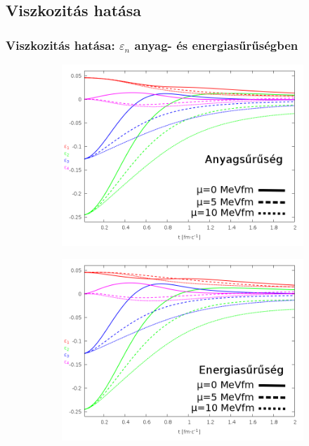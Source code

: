 \documentclass{beamer}
\begin{document}
\subsection{Viszkozitás hatása}
\begin{frame}[noframenumbering]
\frametitle{Viszkozitás hatása: $\varepsilon_n$ anyag- és energiasűrűségben}
\begin{center}
\begin{figure}[H]
	\centering
    \begin{subfigure}[b]{0.49\textwidth}
    		\includegraphics[width=\textwidth]{pic/res/nonrel/eps_visc_r}
	\end{subfigure}
	\begin{subfigure}[b]{0.49\textwidth}
        	\includegraphics[width=\textwidth]{pic/res/nonrel/eps_visc_p}
	\end{subfigure}
\end{figure}
\end{center}
\end{frame}
\end{document}
